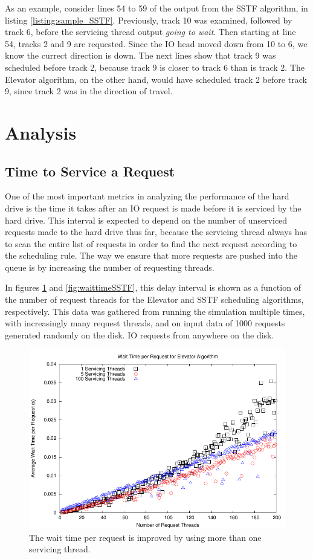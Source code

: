 \documentclass{report}
\begin{document}
As an example, consider lines 54 to 59 of the output from the SSTF algorithm, in listing
\ref{listing:sample_SSTF}. Previously, track 10 was examined, followed by track 6, before
the servicing thread output \emph{going to wait}. Then starting at line 54, tracks 2 and 9
are requested. Since the IO head moved down from 10 to 6, we know the currect direction is
down. The next lines show that track 9 was scheduled before track 2, because track 9 is
closer to track 6 than is track 2. The Elevator algorithm, on the other hand, would have
scheduled track 2 before track 9, since track 2 was in the direction of travel.

\newpage
\section{Analysis} %
\subsection{Time to Service a Request}
One of the most important metrics in analyzing the performance of the hard drive is the
time it takes after an IO request is made before it is serviced by the hard drive. This
interval is expected to depend on the number of unserviced requests made to the hard drive
thus far, because the servicing thread always has to scan the entire list of requests in
order to find the next request according to the scheduling rule. The way we ensure that
more requests are pushed into the queue is by increasing the number of requesting threads.

In figures
\ref{fig:waittimeElevator} and \ref{fig:waittimeSSTF}, this delay interval is shown as a 
function of the number of request threads for the Elevator and SSTF scheduling algorithms,
respectively.
This data was gathered from running the simulation multiple times, with increasingly many
request threads, and on input data of 1000 requests generated randomly on the disk.
IO requests from anywhere on the disk. 

\begin{figure}[htb!]
    \centering
    \includegraphics[scale=1]{waittimeElevator.pdf}
    \caption{The wait time per request is improved by using more than one servicing thread.}
    \label{fig:waittimeElevator}
\end{figure}
\end{document}
